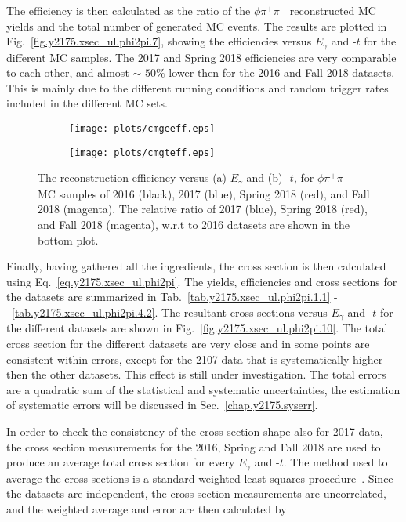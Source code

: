 The efficiency is then calculated as the ratio of the $\phi \pi^+ \pi^-$ reconstructed MC yields and the total number of generated MC events. The results are plotted in Fig.~\ref{fig.y2175.xsec_ul.phi2pi.7}, showing the efficiencies versus $E_{\gamma}$ and -$t$ for the different MC samples. The 2017 and Spring 2018 efficiencies are very comparable to each other, and almost $\sim$ $50\%$ lower then for the 2016 and Fall 2018 datasets. This is mainly due to the different running conditions and random trigger rates included in the different MC sets.

\begin{figure}[t]
    \centering
    \begin{subfigure}[b]{0.5\textwidth}
        \texttt{[image: plots/cmgeeff.eps]}
        \caption{}
        \label{fig.y2175.xsec_ul.phi2pi.9.a}
    \end{subfigure}\hfill
    \begin{subfigure}[b]{0.5\textwidth}
        \texttt{[image: plots/cmgteff.eps]}
        \caption{}
        \label{fig.y2175.xsec_ul.phi2pi.9.b}
    \end{subfigure}
    \caption{\label{fig.y2175.xsec_ul.phi2pi.9}The reconstruction efficiency versus (a) $E_{\gamma}$ and (b) -$t$, for $\phi \pi^+ \pi^-$ MC samples of 2016 (black), 2017 (blue), Spring 2018 (red), and Fall 2018 (magenta). The relative ratio of 2017 (blue), Spring 2018 (red), and Fall 2018 (magenta), w.r.t to 2016 datasets are shown in the bottom plot.}
\end{figure}

Finally, having gathered all the ingredients, the cross section is then calculated using Eq.~\ref{eq.y2175.xsec_ul.phi2pi}. The yields, efficiencies and cross sections for the datasets are summarized in Tab.~\ref{tab.y2175.xsec_ul.phi2pi.1.1} -~\ref{tab.y2175.xsec_ul.phi2pi.4.2}. The resultant cross sections versus $E_{\gamma}$ and -$t$ for the different datasets are shown in Fig.~\ref{fig.y2175.xsec_ul.phi2pi.10}. The total cross section for the different datasets are very close and in some points are consistent within errors, except for the 2107 data that is systematically higher then the other datasets. This effect is still under investigation. The total errors are a quadratic sum of the statistical and systematic uncertainties, the estimation of systematic errors will be discussed in Sec.~\ref{chap.y2175.syserr}.
~\par In order to check the consistency of the cross section shape also for 2017 data, the cross section measurements for the 2016, Spring and Fall 2018 are used to produce an average total cross section for every $E_{\gamma}$ and -$t$. The method used to average the cross sections is a standard weighted least-squares procedure~\cite{Tanabashi18}. Since the datasets are independent, the cross section measurements are uncorrelated, and the weighted average and error are then calculated by

